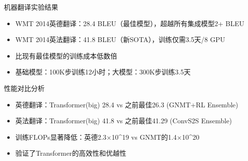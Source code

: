 \documentclass[aspectratio=169,12pt]{beamer}
\begin{document}
\begin{frame}{机器翻译实验结果}


\begin{itemize}

    \item WMT 2014英德翻译：28.4 BLEU（最佳模型），超越所有集成模型2+ BLEU

    \item WMT 2014英法翻译：41.8 BLEU（新SOTA），训练仅需3.5天/8 GPU

    \item 比现有最佳模型的训练成本低数倍

    \item 基础模型：100K步训练12小时；大模型：300K步训练3.5天

\end{itemize}


\end{frame}


\begin{frame}{性能对比分析}


\begin{itemize}

    \item 英德翻译：Transformer(big) 28.4 vs 之前最佳26.3 (GNMT+RL Ensemble)

    \item 英法翻译：Transformer(big) 41.8 vs 之前最佳41.29 (ConvS2S Ensemble)

    \item 训练FLOPs显著降低：英德2.3×10\textasciicircum{}19 vs GNMT的1.4×10\textasciicircum{}20

    \item 验证了Transformer的高效性和优越性

\end{itemize}


\end{frame}
\end{document}
